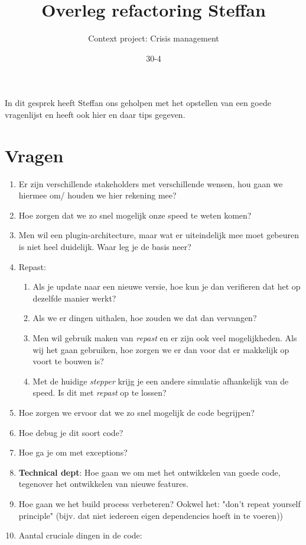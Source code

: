 \documentclass{article}
\begin{document}
\title{Overleg refactoring Steffan}
\author{Context project: Crisis management}
\date{30-4}
\maketitle 

In dit gesprek heeft Steffan ons geholpen met het opstellen van een goede vragenlijst en heeft ook hier en daar tips gegeven. 

\section{Vragen} 
\begin{enumerate}
\item Er zijn verschillende stakeholders met verschillende wensen, hou gaan we hiermee om/ houden we hier rekening mee? 
\item Hoe zorgen dat we zo snel mogelijk onze speed te weten komen? 
\item Men wil een plugin-architecture, maar wat er uiteindelijk mee moet gebeuren is niet heel duidelijk. Waar leg je de basis neer? 
\item Repast: \begin{enumerate} 
\item Als je update naar een nieuwe versie, hoe kun je dan verifieren dat het op dezelfde manier werkt? 
\item Als we er dingen uithalen, hoe zouden we dat dan vervangen? 
\item Men wil gebruik maken van \emph{repast} en er zijn ook veel mogelijkheden. Als wij het gaan gebruiken, hoe zorgen we er dan voor dat er makkelijk op voort te bouwen is? 
\item Met de huidige \emph{stepper} krijg je een andere simulatie afhankelijk van de speed. Is dit met \emph{repast} op te lossen? 
\end{enumerate}
\item Hoe zorgen we ervoor dat we zo snel mogelijk de code begrijpen?
\item Hoe debug je dit soort code?
\item Hoe ga je om met exceptions? 
\item \textbf{Technical dept}: Hoe gaan we om met het ontwikkelen van goede code, tegenover het ontwikkelen van nieuwe features. 
\item Hoe gaan we het build process verbeteren? Ookwel het: "don't repeat yourself principle" (bijv. dat niet iedereen eigen dependencies hoeft in te voeren))
\item Aantal cruciale dingen in de code:

\end{enumerate}
\end{document}

